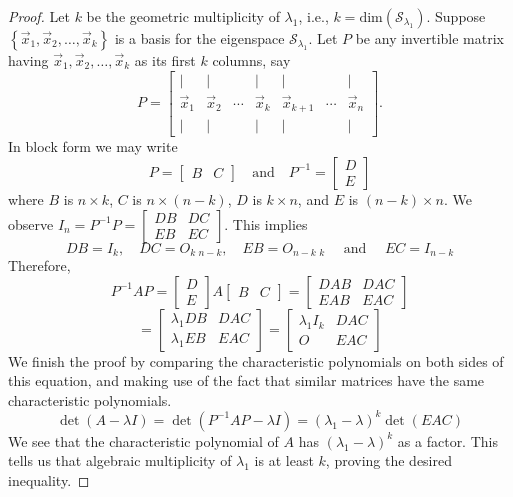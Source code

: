\documentclass{ximera}
\begin{document}
\begin{proof}
Let $k$ be the geometric multiplicity of $\lambda_1$, i.e., $k=\mbox{dim}(\mathcal{S}_{\lambda_1})$.  Suppose $\left\{\vec{x}_1, \vec{x}_2, \ldots ,\vec{x}_k\right\}$ is a basis for the eigenspace $\mathcal{S}_{\lambda_1}$.  Let $P$ be any invertible matrix having $\vec{x}_1,  \vec{x}_2, \ldots ,\vec{x}_k$ as its first $k$ columns, say 
$$P=\begin{bmatrix}
| & | &  & | & | & & | \\
\vec{x}_1 & \vec{x}_2 & \cdots & \vec{x}_k & \vec{x}_{k+1} & \cdots & \vec{x}_n \\
| & | &  & | & | & & |
\end{bmatrix}.$$  
In block form we may write 
$$P=\begin{bmatrix}
B&C
\end{bmatrix} \quad \text{and} \quad P^{-1}=\begin{bmatrix}
D \\
E
\end{bmatrix}$$
where $B$ is $n \times k$, $C$ is  $n \times (n-k)$, $D$ is $k \times n$, and $E$ is $(n-k) \times n$.  We observe
$I_n = P^{-1}P = \left[\begin{array}{c|c}  
DB & DC \\ \hline
EB & EC
 \end{array}\right] $. 
This implies
$$DB = I_k,\quad DC=O_{k\,\,n-k},\quad EB = O_{n-k\,\,k} \quad\text{ and }\quad EC = I_{n-k}$$
Therefore,
\begin{equation*}
P^{-1}AP=\begin{bmatrix}
D \\
E
\end{bmatrix} 
A
\begin{bmatrix}
B&C
\end{bmatrix} =
\left[\begin{array}{c|c}  
DAB & DAC \\ \hline
EAB & EAC
 \end{array}\right]
\end{equation*}
\begin{equation*}
=  \left[\begin{array}{c|c}  
\lambda_1 DB & DAC \\ \hline
\lambda_1 EB & EAC
 \end{array}\right]  
=  \left[\begin{array}{c|c}  
\lambda_1 I_k & DAC \\ \hline
O & EAC
 \end{array}\right]  
\end{equation*}
We finish the proof by comparing the characteristic polynomials on both sides of this equation, and making use of the fact that similar matrices have the same characteristic polynomials.  
$$\det(A-\lambda I) = \det(P^{-1}AP-\lambda I)=(\lambda_1 - \lambda)^k \det(EAC)$$
We see that the characteristic polynomial of $A$ has $(\lambda_1 - \lambda)^k$ as a factor.  This tells us that algebraic multiplicity of $\lambda_1$ is at least $k$, proving the desired inequality. 
\end{proof}
\end{document}
